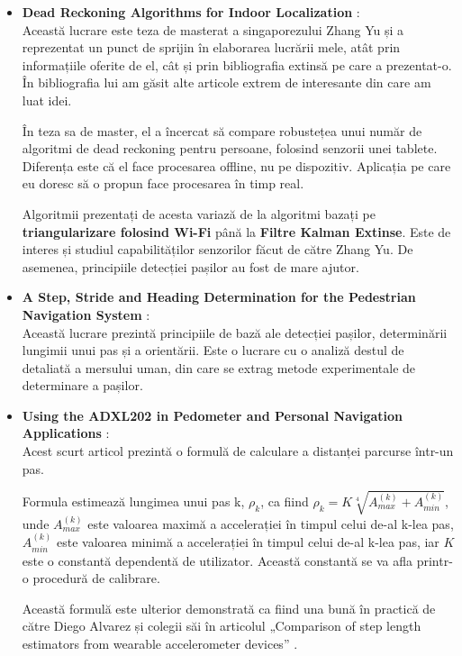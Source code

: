 \documentclass[12pt,a4paper]{article}
\begin{document}
\begin{itemize}  
\item \textbf{Dead Reckoning Algorithms for Indoor Localization} \cite{ZhangYu}:\\
Această lucrare este teza de masterat a singaporezului Zhang Yu și a reprezentat un punct de sprijin în elaborarea lucrării mele, atât prin informațiile oferite de el, cât și prin bibliografia extinsă pe care a prezentat-o. În bibliografia lui am găsit alte articole extrem de interesante din care am luat idei.

În teza sa de master, el a încercat să compare robustețea unui număr de algoritmi de dead reckoning pentru persoane, folosind senzorii unei tablete. Diferența este că el face procesarea offline, nu pe dispozitiv. Aplicația pe care eu doresc să o propun face procesarea în timp real.

Algoritmii prezentați de acesta variază de la algoritmi bazați pe \textbf{triangularizare folosind Wi-Fi} până la \textbf{Filtre Kalman Extinse}. Este de interes și studiul capabilităților senzorilor făcut de către Zhang Yu. De asemenea, principiile detecției pașilor au fost de mare ajutor.

\item \textbf{A Step, Stride and Heading Determination for the Pedestrian
Navigation System} \cite{StepLengthAndHeadingDetermination}:\\
Această lucrare prezintă principiile de bază ale detecției pașilor, determinării lungimii unui pas și a orientării. Este o lucrare cu o analiză destul de detaliată a mersului uman, din care se extrag metode experimentale de determinare a pașilor.

\item \textbf{Using the ADXL202 in Pedometer and Personal Navigation Applications} \cite{HarveyWeinberg}:\\
Acest scurt articol prezintă o formulă de calculare a distanței parcurse într-un pas.

Formula estimează lungimea unui pas k, $\rho_{k}$, ca fiind $\rho_{k} = K \sqrt[4]{A_{max}^{(k)} + A_{min}^{(k)}}$, unde $A_{max}^{(k)}$ este valoarea maximă a accelerației în timpul celui de-al k-lea pas, $A_{min}^{(k)}$ este valoarea minimă a accelerației în timpul celui de-al k-lea pas, iar $K$ este o constantă dependentă de utilizator. Această constantă se va afla printr-o procedură de calibrare.

Această formulă este ulterior demonstrată ca fiind una bună în practică de către Diego Alvarez și colegii săi în articolul „Comparison of step length estimators from wearable accelerometer devices” \cite{StepLengthEstimatorsComparaison}.


\end{itemize}
\end{document}
